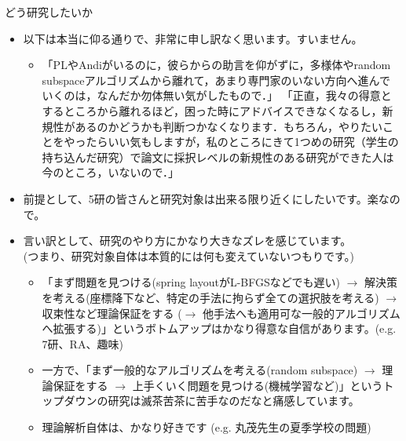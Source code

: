 \documentclass[13pt,aspectratio=169,table,dvipdfmx]{beamer}
\newif\ifShowHidden
\begin{document}
\ifShowHidden
    \begin{frame}{\LARGE{どう研究したいか}}
        \begin{itemize}
            \item 以下は本当に仰る通りで、非常に申し訳なく思います。すいません。
                  \begin{itemize}
                      \item
                            「PLやAndiがいるのに，彼らからの助言を仰がずに，多様体やrandom subspaceアルゴリズムから離れて，あまり専門家のいない方向へ進んでいくのは，なんだか勿体無い気がしたもので．」
                            「正直，我々の得意とするところから離れるほど，困った時にアドバイスできなくなるし，新規性があるのかどうかも判断つかなくなります．もちろん，やりたいことをやったらいい気もしますが，私のところにきて1つめの研究（学生の持ち込んだ研究）で論文に採択レベルの新規性のある研究ができた人は今のところ，いないので．」
                  \end{itemize}
            \item 前提として、5研の皆さんと研究対象は出来る限り近くにしたいです。楽なので。
            \item 言い訳として、研究のやり方にかなり大きなズレを感じています。\\
                  (つまり、研究対象自体は本質的には何も変えていないつもりです。)
                  \begin{itemize}
                      \item 「まず問題を見つける(spring layoutがL-BFGSなどでも遅い) $\to$ 解決策を考える(座標降下など、特定の手法に拘らず全ての選択肢を考える) $\to$ 収束性など理論保証をする ($\to$ 他手法へも適用可な一般的アルゴリズムへ拡張する)」というボトムアップはかなり得意な自信があります。(e.g. 7研、RA、趣味)
                      \item 一方で、「まず一般的なアルゴリズムを考える(random subspace) $\to$ 理論保証をする $\to$ 上手くいく問題を見つける(機械学習など)」というトップダウンの研究は滅茶苦茶に苦手なのだなと痛感しています。
                      \item 理論解析自体は、かなり好きです (e.g. 丸茂先生の夏季学校の問題)
                  \end{itemize}
        \end{itemize}
    \end{frame}
\end{document}
